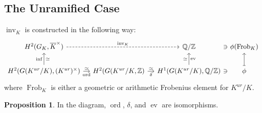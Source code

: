 \documentclass[class=article, crop=false]{standalone}
\newcommand{\ZZ}{\mathbb{Z}}
\newcommand{\QQ}{\mathbb{Q}}
\newcommand{\Frob}{\operatorname{Frob}}
\newcommand{\inv}{\operatorname{inv}}
\newcommand{\ord}{\operatorname{ord}}
\newcommand{\ev}{\operatorname{ev}}
\theoremstyle{definition}
\newtheorem{proposition}{Proposition}[section]
\begin{document}
\subsection{The Unramified Case}
$\inv_K$ is constructed in the following way:
\[
	\begin{tikzcd}[column sep=1em]
		H^{2}(G_K,\overline{K}^{\times})\ar[rr,dashed,"\inv_K"] & & \QQ/\ZZ &[-1.5em] \ni &[-1.5em] \phi(\Frob_K)\\
		H^{2}(G(K^{ur}/K),(K^{ur})^{\times})\ar[r,"\ord"',"\simeq"]\ar[u,"\inf","\simeq"'] & H^{2}(G(K^{ur}/K,\ZZ)\ar[r,"\delta"',"\simeq"] & H^{1}(G(K^{ur}/K),\QQ/\ZZ)\ar[u,"\ev"',"\simeq"] &[-1.5em] \ni &[-1.5em] \phi\ar[u,mapsto] 
\end{tikzcd}
\] 
where $\Frob_K$ is either a geometric or arithmetic Frobenius element for $K^{ur}/K$.
\begin{proposition}
	In the diagram, $\ord$, $\delta$, and $\ev$ are isomorphisms.
\end{proposition}
\end{document}
